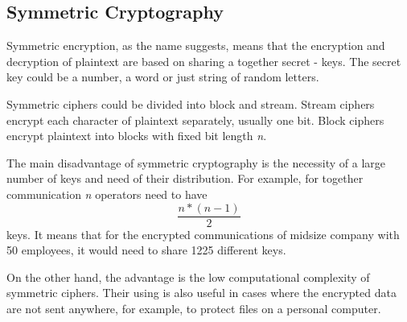 \documentclass[
  digital, %
  notable,   %
  lof,     %
  lot,     %
]{fithesis3}
\begin{document}
\subsection{Symmetric Cryptography}
Symmetric encryption, as the name suggests, means that the encryption and decryption of 
plaintext are based on sharing a together secret - keys. The secret key could be a number, a 
word or just string of random letters. %

Symmetric ciphers could be divided into block and stream. Stream ciphers encrypt each character 
of plaintext separately, usually one bit. Block ciphers encrypt plaintext into blocks with 
fixed bit length \textit{n}. %

The main disadvantage of symmetric cryptography is the necessity of a large number of keys 
and need of their distribution. For example, for together communication \textit{n} operators 
need to have \[ \frac{n * (n - 1)}{2}\] keys. It means that for the encrypted communications of 
midsize company with 50 employees, it would need to share 1225 different keys. 

On the other hand, the advantage is the low computational complexity of symmetric ciphers. 
Their using is also useful in cases where the encrypted data are not sent anywhere, for example, 
to protect files on a personal computer.
 
\end{document}
